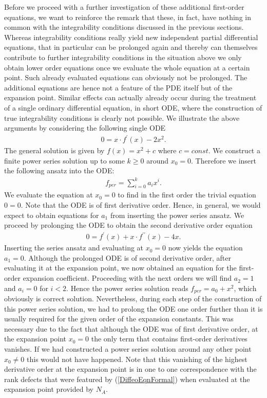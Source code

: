 \documentclass[a4paper,12pt, DIV=14, BCOR=5mm, twoside, headsepline, numbers=noenddot]{scrbook}
\begin{document}
Before we proceed with a further investigation of these additional first-order equations, we want to reinforce the remark that these, in fact, have nothing in common with the integrability conditions discussed in the previous sections. Whereas integrability conditions really yield new independent partial differential equations, that in particular can be prolonged again and thereby can themselves contribute to further integrability conditions in the situation above we only obtain lower order equations once we evaluate the whole equation at a certain point. Such already evaluated equations can obviously not be prolonged. The additional equations are hence not a feature of the PDE itself but of the expansion point. Similar effects can actually already occur during the treatment of a single ordinary differential equation, in short ODE, where the construction of true integrability conditions is clearly not possible. We illustrate the above arguments by considering the following single ODE
\begin{align}
    0 = x \cdot f^{\prime}(x) - 2x^2.
\end{align}
The general solution is given by $f(x) = x^2 +c$ where $c=const$. We construct a finite power series solution up to some $k \geq 0$ around $x_0 = 0$. Therefore we insert the following ansatz into the ODE:
\begin{align}
    f_{per} = \sum_{i=0}^k a_i x^i.
\end{align}
We evaluate the equation at $x_0=0$ to find in the first order the trivial equation $0=0$. Note that the ODE is of first derivative order. Hence, in general, we would expect to obtain equations for $a_1$ from inserting the power series ansatz. We proceed by prolonging the ODE to obtain the second derivative order equation
\begin{align}
    0 = f^{\prime}(x) + x \cdot f^{\prime \prime}(x) - 4 x.
\end{align}
Inserting the series ansatz and evaluating at $x_0=0$ now yields the equation $a_1=0$. Although the prolonged ODE is of second derivative order, after evaluating it at the expansion point, we now obtained an equation for the first-order expansion coefficient. Proceeding with the next orders we will find $a_2 = 1$ and $a_i = 0$ for $i < 2$. Hence the power series solution reads $f_{per} = a_0 + x^2$, which obviously is correct solution. Nevertheless, during each step of the construction of this power series solution, we had to prolong the ODE one order further than it is usually required for the given order of the expansion constants. This was necessary due to the fact that although the ODE was of first derivative order, at the expansion point $x_0=0$ the only term that contains first-order derivatives vanishes. If we had constructed a power series solution around any other point $x_0 \neq 0$ this would not have happened. Note that this vanishing of the highest derivative order at the expansion point is in one to one correspondence with the rank defects that were featured by (\ref{DiffeoEqnFormal}) when evaluated at the expansion point provided by $N_A$. 
\end{document}
